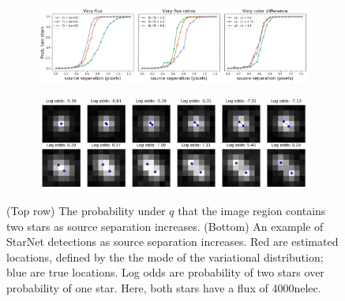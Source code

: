 \begin{figure}[!h]
    \centering
    \begin{subfigure}{0.95\textwidth}
        \includegraphics[width=\textwidth]{figures/deblending_test.png}
    \end{subfigure}
      \begin{subfigure}{0.95\textwidth}
        \includegraphics[width=\textwidth]{figures/deblending_ex.png}
    \end{subfigure}
    \caption{(Top row) The probability under $q$ that the image region contains two stars as source separation increases.
    (Bottom) An example of StarNet detections as source separation increases. Red are estimated locations, defined by the the mode of the variational distribution; blue are true locations. Log odds are probability of two stars over probability of one star. Here, both stars have a flux of 4000nelec.}
    \label{fig:deblending_fig}
\end{figure}
